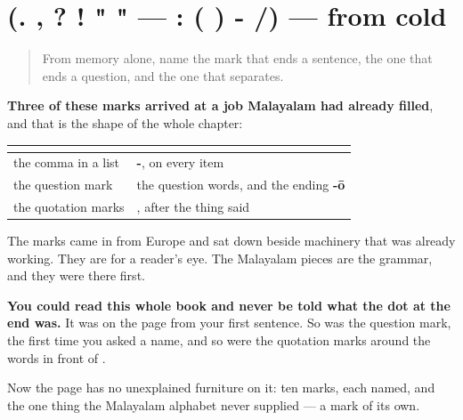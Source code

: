 \section[(. , ? ! " " — : ( ) - /)]{(. , ? ! " " — : ( ) - /) — from cold}

\label{lesson:ML-R108-marks-recall}



\begin{quote}
From memory alone, name the mark that ends a sentence, the one that ends a question, and the one that separates.
\end{quote}

\begin{grammarlens}[title={Grammar Lens: what was already doing the job}]
\textbf{Three of these marks arrived at a job Malayalam had already filled}, and that is the shape of the whole chapter:

\noindent
\begin{tabularx}{\linewidth}{@{}>{\raggedright\arraybackslash}X>{\raggedright\arraybackslash}X@{}}
\toprule
\textbf{} & \textbf{} \\
\midrule
the comma in a list & \textbf{-\ml{ഉം}}, on every item \\
the question mark & the question words, and the ending \textbf{-ō} \\
the quotation marks & \textbf{\ml{എന്ന്}}, after the thing said \\
\bottomrule
\end{tabularx}

The marks came in from Europe and sat down beside machinery that was already working. They are for a reader's eye. The Malayalam pieces are the grammar, and they were there first.
\end{grammarlens}

\begin{grammarlens}[title={What you've built}]
\textbf{You could read this whole book and never be told what the dot at the end was.} It was on the page from your first sentence. So was the question mark, the first time you asked a name, and so were the quotation marks around the words in front of \textbf{}.

Now the page has no unexplained furniture on it: ten marks, each named, and the one thing the Malayalam alphabet never supplied — a mark of its own.
\end{grammarlens}

